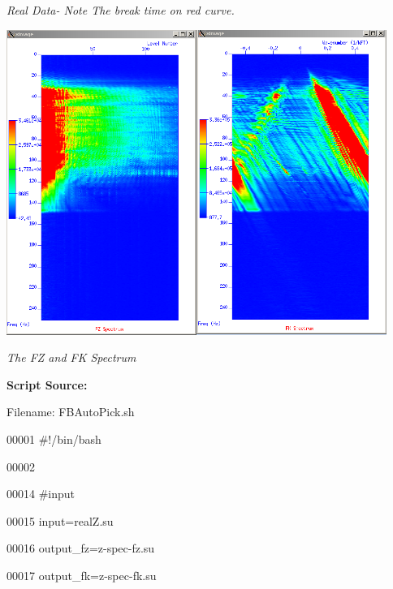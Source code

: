 \documentclass{article}
\begin{document}
\vspace{280pt}
\begin{center}
\textit{Real Data- Note The break time on red curve. }

\vspace{16pt}
\includegraphics[width=351pt, height=282pt, keepaspectratio=true]{LatihanVSPsu-fig006.png}

\vspace{16pt}
\textit{The FZ and FK Spectrum\pagebreak{}}
\end{center}

\vspace{16pt}
\baselineskip=12pt
\leftskip=0pt
\textbf{Script Source:}

\vspace{4pt}
Filename: FBAutoPick.sh

\vspace{16pt}
00001 \#!/bin/bash

\vspace{4pt}
00002 

\vspace{4pt}
00014 \#input

\vspace{4pt}
00015 input=realZ.su

\vspace{4pt}
00016 output\_fz=z-spec-fz.su

\vspace{4pt}
00017 output\_fk=z-spec-fk.su
\end{document}
